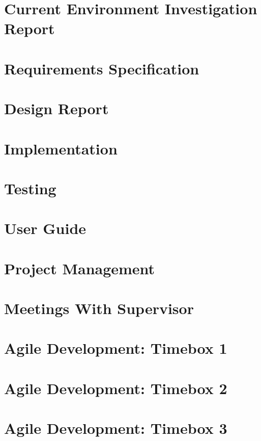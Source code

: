 \documentclass[journal, draftcls]{IEEEtran}
\begin{document}
\section{Current Environment Investigation Report}
\section{Requirements Specification}
\section{Design Report}
\section{Implementation}
\section{Testing}
\section{User Guide}
\section{Project Management}
\section{Meetings With Supervisor}
\section{Agile Development: Timebox 1}
\section{Agile Development: Timebox 2}
\section{Agile Development: Timebox 3}
\end{document}
